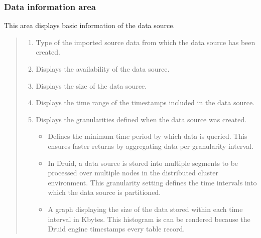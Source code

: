 \documentclass[letterpaper,10pt,english]{sphinxmanual}
\begin{document}
\subsubsection{Data information area}
\label{\detokenize{discovery/part02/data_source_detail_view:id3}}
This area displays basic information of the data source.
\begin{quote}

\begin{figure}[H]
\centering

\noindent{}
\end{figure}
\begin{enumerate}
\def\theenumi{\arabic{enumi}}
\def\labelenumi{\theenumi .}
\makeatletter\def\p@enumii{\p@enumi \theenumi .}\makeatother
\item {} 
 Type of the imported source data from which the data source has been created.

\item {} 
 Displays the availability of the data source.

\item {} 
 Displays the size of the data source.

\item {} 
 Displays the time range of the timestamps included in the data source.

\item {} 
 Displays the granularities defined when the data source was created.
\begin{itemize}
\item {} 
 Defines the minimum time period by which data is queried. This ensures faster returns by aggregating data per granularity interval.

\item {} 
 In Druid, a data source is stored into multiple segments to be processed over multiple nodes in the distributed cluster environment. This granularity setting defines the time intervals into which the data source is partitioned.

\item {} 
 A graph displaying the size of the data stored within each time interval in Kbytes. This histogram is can be rendered because the Druid engine timestamps every table record.

\end{itemize}

\end{enumerate}
\end{quote}
\end{document}
